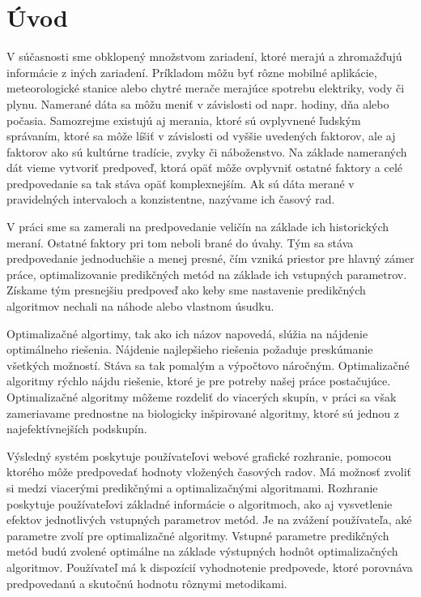 \documentclass[a4paper,slovak,12pt,appendix]{article}
\begin{document}
\section{Úvod}
V súčasnosti sme obklopený množstvom zariadení, ktoré merajú a zhromažďujú
informácie z iných zariadení. Príkladom môžu byť rôzne mobilné aplikácie,
meteorologické stanice alebo chytré merače merajúce spotrebu elektriky, vody
či plynu. Namerané dáta sa môžu meniť v závislosti od napr. hodiny, dňa alebo
počasia. Samozrejme existujú aj merania, ktoré sú ovplyvnené ľudským správaním,
ktoré sa môže líšiť v závislosti od vyššie uvedených faktorov, ale aj faktorov
ako sú kultúrne tradície, zvyky či náboženstvo. Na základe nameraných dát vieme
vytvoriť predpoveď, ktorá opäť môže ovplyvniť ostatné faktory a celé
predpovedanie sa tak stáva opäť komplexnejším. Ak sú dáta merané v pravidelných
intervaloch a konzistentne, nazývame ich časový rad.

V práci sme sa zamerali na predpovedanie veličín na základe ich historických
meraní. Ostatné faktory pri tom neboli brané do úvahy. Tým sa stáva
predpovedanie jednoduchšie a menej presné, čím vzniká priestor pre hlavný zámer
práce, optimalizovanie predikčných metód na základe ich vstupných parametrov.
Získame tým presnejšiu predpoveď ako keby sme nastavenie predikčných algoritmov
nechali na náhode alebo vlastnom úsudku.

Optimalizačné algortimy, tak ako ich názov napovedá, slúžia na nájdenie
optimálneho riešenia. Nájdenie najlepšieho riešenia požaduje preskúmanie
všetkých možností. Stáva sa tak pomalým a výpočtovo náročným. Optimalizačné
algoritmy rýchlo nájdu riešenie, ktoré je pre potreby našej práce postačujúce.
Optimalizačné algoritmy môžeme rozdeliť do viacerých skupín, v práci sa však
zameriavame prednostne na biologicky inšpirované algoritmy, ktoré sú jednou
z najefektívnejších podskupín.

Výsledný systém poskytuje používateľovi webové grafické rozhranie, pomocou
ktorého môže predpovedať hodnoty vložených časových radov. Má možnosť zvoliť si
medzi viacerými predikčnými a optimalizačnými algoritmami. Rozhranie poskytuje
používateľovi základné informácie o algoritmoch, ako aj vysvetlenie efektov
jednotlivých vstupných parametrov metód. Je na zvážení používateľa, aké
parametre zvolí pre optimalizačné algoritmy. Vstupné parametre predikčných
metód budú zvolené optimálne na základe výstupných hodnôt optimalizačných
algoritmov. Používateľ má k dispozícií vyhodnotenie predpovede, ktoré porovnáva
predpovedanú a skutočnú hodnotu rôznymi metodikami.
\end{document}
